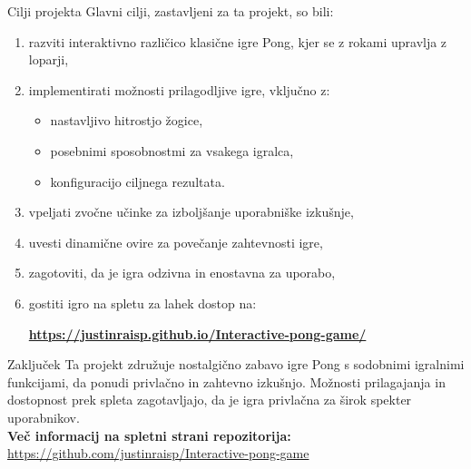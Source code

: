 \documentclass{beamer}
\begin{document}
\begin{frame}{Cilji projekta}
    Glavni cilji, zastavljeni za ta projekt, so bili:
    \begin{enumerate}
        \item razviti interaktivno različico klasične igre Pong, kjer se z rokami upravlja z loparji,
        \item implementirati možnosti prilagodljive igre, vključno z:
            \begin{itemize}
                \item nastavljivo hitrostjo žogice,
                \item posebnimi sposobnostmi za vsakega igralca,
                \item konfiguracijo ciljnega rezultata.
            \end{itemize}
        \item vpeljati zvočne učinke za izboljšanje uporabniške izkušnje,
        \item uvesti dinamične ovire za povečanje zahtevnosti igre,
        \item zagotoviti, da je igra odzivna in enostavna za uporabo,
        \item gostiti igro na spletu za lahek dostop na:
        \begin{center}
            \textbf{\url{https://justinraisp.github.io/Interactive-pong-game/}}
        \end{center}
    \end{enumerate}
\end{frame}

\begin{frame}{Zaključek}
    Ta projekt združuje nostalgično zabavo igre Pong s sodobnimi igralnimi funkcijami, da ponudi privlačno in zahtevno izkušnjo. Možnosti prilagajanja in dostopnost prek spleta zagotavljajo, da je igra privlačna za širok spekter uporabnikov. \\
    
    \bigskip
    \textbf{Več informacij na spletni strani repozitorija:} \\
    \url{https://github.com/justinraisp/Interactive-pong-game}
\end{frame}
\end{document}
